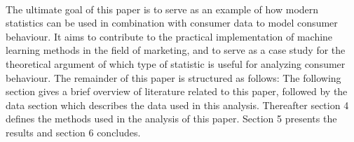 \

The ultimate goal of this paper is to serve as an example of how modern statistics can be used in combination with consumer data to model consumer behaviour. It aims to contribute to the practical implementation of machine learning methods in the field of marketing, and to serve as a case study for the theoretical argument of which type of statistic is useful for analyzing consumer behaviour. The remainder of this paper is structured as follows: The following section gives a brief overview of literature related to this paper, followed by the data section which describes the data used in this analysis. Thereafter section 4 defines the methods used in the analysis of this paper. Section 5 presents the results and section 6 concludes. 


\

 














